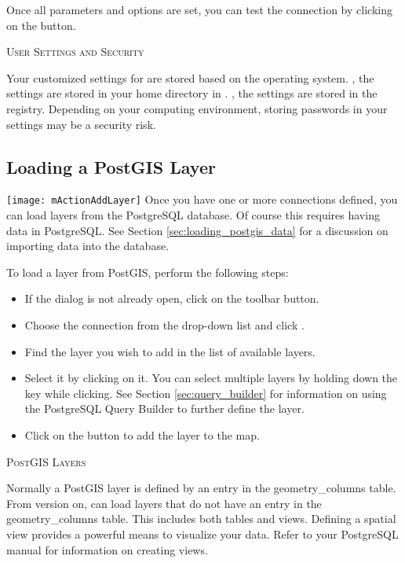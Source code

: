 Once all parameters and options are set, you can test the connection by
clicking on the  button.

\begin{Tip}\caption{\textsc{\qg User Settings and
Security}}
Your customized settings for \qg are stored based on the operating
system. \nix, the settings are stored in your home directory in
. \win, the settings are stored in the registry. Depending on
your computing environment, storing passwords in your \qg settings may be a
security risk.
\end{Tip}

\subsection{Loading a PostGIS Layer}

\texttt{[image: mActionAddLayer]} Once you have one or more
connections defined, you can load layers from the PostgreSQL database. Of
course this requires having data in PostgreSQL. See Section
\ref{sec:loading_postgis_data} for a discussion on importing data into the
database.

To load a layer from PostGIS, perform the following steps:

\begin{itemize}[label=--]
\item If the  dialog is not already open, click on the
 toolbar button.
\item Choose the connection from the drop-down list and click .
\item Find the layer you wish to add in the list of available layers.
\item Select it by clicking on it. You can select multiple layers by holding
down the  key while clicking. See Section \ref{sec:query_builder} for
information on using the PostgreSQL Query Builder to further define the layer.
\item Click on the  button to add the layer to the map.
\end{itemize}

\begin{Tip}\caption{\textsc{PostGIS Layers}}
Normally a PostGIS layer is defined by an entry in the
geometry\_columns table. From version \OLD %
on, \qg can load layers that do not have
an entry in the geometry\_columns table. This includes both tables and views.
Defining a spatial view provides a powerful means to visualize your data. Refer
to your PostgreSQL manual for information on creating views.
\end{Tip}

